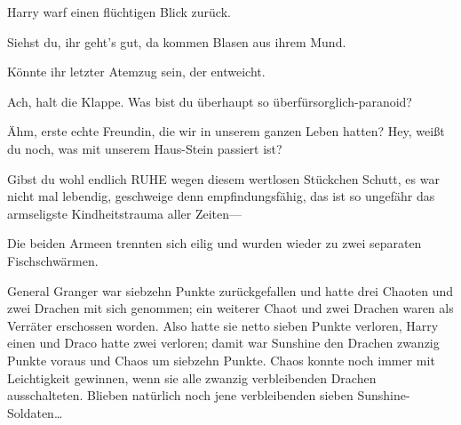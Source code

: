 Harry warf einen flüchtigen Blick zurück.

\begin{em}
Siehst du, ihr geht’s gut, da kommen Blasen aus ihrem Mund.

Könnte ihr letzter Atemzug sein, der entweicht.

Ach, halt die Klappe. Was bist du überhaupt so überfürsorglich-paranoid?

Ähm, erste echte Freundin, die wir in unserem ganzen Leben hatten? Hey, weißt du noch, was mit unserem Haus-Stein passiert ist?

Gibst du wohl endlich RUHE wegen diesem wertlosen Stückchen Schutt, es war nicht mal lebendig, geschweige denn empfindungsfähig, das ist so ungefähr das armseligste Kindheitstrauma aller Zeiten—
\end{em}

Die beiden Armeen trennten sich eilig und wurden wieder zu zwei separaten Fischschwärmen.

General Granger war siebzehn Punkte zurückgefallen und hatte drei Chaoten und zwei Drachen mit sich genommen; ein weiterer Chaot und zwei Drachen waren als Verräter erschossen worden. Also hatte sie netto sieben Punkte verloren, Harry einen und Draco hatte zwei verloren; damit war Sunshine den Drachen zwanzig Punkte voraus und Chaos um siebzehn Punkte. Chaos konnte noch immer mit Leichtigkeit gewinnen, wenn sie alle zwanzig verbleibenden Drachen ausschalteten. Blieben natürlich noch jene verbleibenden sieben Sunshine-Soldaten…

